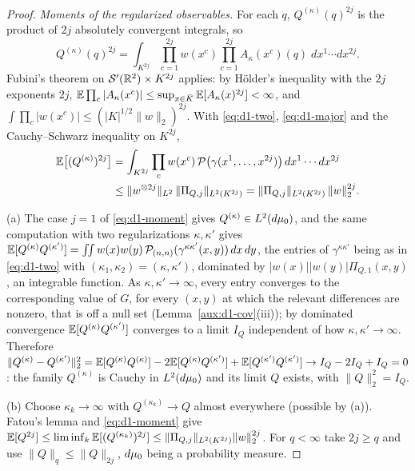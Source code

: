\begin{proof}
\emph{Moments of the regularized observables.} For each $q$, $Q^{(\kappa)}(q)^{2j}$ is the
product of $2j$ absolutely convergent integrals, so
\[
 Q^{(\kappa)}(q)^{2j}=\int_{K^{2j}}\prod_{c=1}^{2j}w(x^c)\prod_{c=1}^{2j}A_\kappa(x^c)(q)\;
 dx^1\cdots dx^{2j} .
\]
Fubini's theorem on $\mathcal S'(\mathbb{R}^2)\times K^{2j}$ applies: by H\"older's inequality with the
$2j$ exponents $2j$, $\mathbb{E}\prod_c|A_\kappa(x^c)|\le\sup_{x\in\bar K}\mathbb{E}[A_\kappa(x)^{2j}]<\infty$,
and $\int\prod_c|w(x^c)|\le(|K|^{1/2}\|w\|_2)^{2j}$. With \eqref{eq:d1-two},
\eqref{eq:d1-major} and the Cauchy--Schwarz inequality on $K^{2j}$,
\begin{align}
 \mathbb{E}\bigl[(Q^{(\kappa)})^{2j}\bigr]
 &=\int_{K^{2j}}\prod_cw(x^c)\,\mathcal P\bigl(\gamma(x^1,\dots,x^{2j})\bigr)\,
   dx^1\cdots dx^{2j}\notag\\
 &\le\|w^{\otimes2j}\|_{L^2}\,\|\Pi_{Q,j}\|_{L^2(K^{2j})}
 =\|\Pi_{Q,j}\|_{L^2(K^{2j})}\,\|w\|_2^{2j} .\label{eq:d1-moment}
\end{align}

(a) The case $j=1$ of \eqref{eq:d1-moment} gives $Q^{(\kappa)}\in L^2(d\mu_0)$, and the same
computation with two regularizations $\kappa,\kappa'$ gives
$\mathbb{E}[Q^{(\kappa)}Q^{(\kappa')}]=\iint w(x)w(y)\,\mathcal P_{(n,n)}(\gamma^{\kappa\kappa'}(x,y))\,dx\,dy$,
the entries of $\gamma^{\kappa\kappa'}$ being as in \eqref{eq:d1-two} with
$(\kappa_1,\kappa_2)=(\kappa,\kappa')$, dominated by $|w(x)||w(y)|\Pi_{Q,1}(x,y)$, an
integrable function. As $\kappa,\kappa'\to\infty$, every entry converges to the corresponding
value of $G$, for every $(x,y)$ at which the relevant differences are nonzero, that is off a
null set (Lemma~\ref{aux:d1-cov}(iii)); by dominated convergence
$\mathbb{E}[Q^{(\kappa)}Q^{(\kappa')}]$ converges to a limit $I_Q$ independent of how
$\kappa,\kappa'\to\infty$. Therefore
$\|Q^{(\kappa)}-Q^{(\kappa')}\|_2^2=\mathbb{E}[Q^{(\kappa)}Q^{(\kappa)}]-2\mathbb{E}[Q^{(\kappa)}Q^{(\kappa')}]
+\mathbb{E}[Q^{(\kappa')}Q^{(\kappa')}]\to I_Q-2I_Q+I_Q=0$: the family $Q^{(\kappa)}$ is Cauchy in
$L^2(d\mu_0)$ and its limit $Q$ exists, with $\|Q\|_2^2=I_Q$.

(b) Choose $\kappa_k\to\infty$ with $Q^{(\kappa_k)}\to Q$ almost everywhere (possible by (a)).
Fatou's lemma and \eqref{eq:d1-moment} give
$\mathbb{E}[Q^{2j}]\le\liminf_k\mathbb{E}[(Q^{(\kappa_k)})^{2j}]\le\|\Pi_{Q,j}\|_{L^2(K^{2j})}\|w\|_2^{2j}$.
For $q<\infty$ take $2j\ge q$ and use $\|Q\|_q\le\|Q\|_{2j}$, $d\mu_0$ being a probability
measure.


\end{proof}
